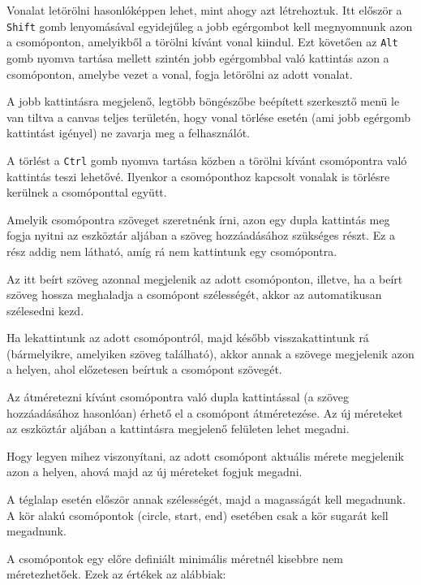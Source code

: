 Vonalat letörölni hasonlóképpen lehet, mint ahogy azt létrehoztuk. Itt először a \texttt{Shift} gomb lenyomásával egyidejűleg a jobb egérgombot kell megnyomnunk azon a csomóponton, amelyikből a törölni kívánt vonal kiindul. Ezt követően az \texttt{Alt} gomb nyomva tartása mellett szintén jobb egérgombbal való kattintás azon a csomóponton, amelybe vezet a vonal, fogja letörölni az adott vonalat.

A jobb kattintásra megjelenő, legtöbb böngészőbe beépített szerkesztő menü le van tiltva a canvas teljes területén, hogy vonal törlése esetén (ami jobb egérgomb kattintást igényel) ne zavarja meg a felhasználót.


A törlést a \texttt{Ctrl} gomb nyomva tartása közben a törölni kívánt csomópontra való kattintás teszi lehetővé. Ilyenkor a csomóponthoz kapcsolt vonalak is törlésre kerülnek a csomóponttal együtt.


Amelyik csomópontra szöveget szeretnénk írni, azon egy dupla kattintás meg fogja nyitni az eszköztár aljában a szöveg hozzáadásához szükséges részt. Ez a rész addig nem látható, amíg rá nem kattintunk egy csomópontra.

Az itt beírt szöveg azonnal megjelenik az adott csomóponton, illetve, ha a beírt szöveg hossza meghaladja a csomópont szélességét, akkor az automatikusan szélesedni kezd.

Ha lekattintunk az adott csomópontról, majd később visszakattintunk rá (bármelyikre, amelyiken szöveg található), akkor annak a szövege megjelenik azon a helyen, ahol előzetesen beírtuk a csomópont szövegét.


Az átméretezni kívánt csomópontra való dupla kattintással (a szöveg hozzáadásához hasonlóan) érhető el a csomópont átméretezése. Az új méreteket az eszköztár aljában a kattintásra megjelenő felületen lehet megadni.

Hogy legyen mihez viszonyítani, az adott csomópont aktuális mérete megjelenik azon a helyen, ahová majd az új méreteket fogjuk megadni.

A téglalap esetén először annak szélességét, majd a magasságát kell megadnunk. A kör alakú csomópontok (circle, start, end) esetében csak a kör sugarát kell megadnunk.

A csomópontok egy előre definiált minimális méretnél kisebbre nem méretezhetőek. Ezek az értékek az alábbiak:

